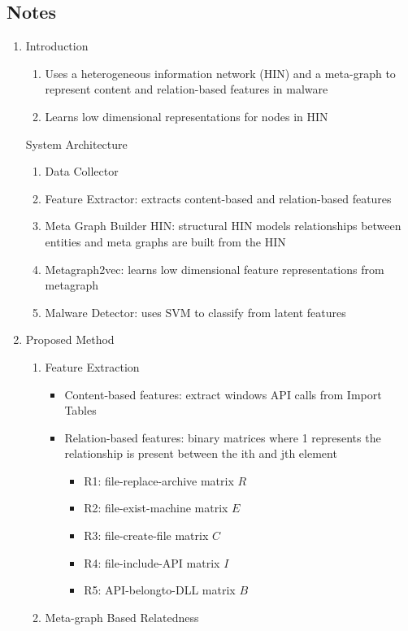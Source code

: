 \documentclass{article}
\begin{document}
\subsection*{Notes}

\begin{enumerate}
	\item Introduction
	\begin{enumerate}
	\item Uses a heterogeneous information network (HIN) and a meta-graph to represent content and relation-based features in malware
	\item Learns low dimensional representations for nodes in HIN
	\end{enumerate}
	System Architecture
	\begin{enumerate}
		\item Data Collector
		\item Feature Extractor: extracts content-based and relation-based features
		\item Meta Graph Builder HIN: structural HIN models relationships between entities and meta graphs are built from the HIN
		\item Metagraph2vec: learns low dimensional feature representations from metagraph
		\item Malware Detector: uses SVM to classify from latent features
	\end{enumerate}
	\item Proposed Method
	\begin{enumerate}
		\item Feature Extraction
		\begin{itemize}
			\item Content-based features: extract windows API calls from Import Tables
			\item Relation-based features: binary matrices where 1 represents the relationship is present between the ith and jth element
			\begin{itemize}
				\item R1: file-replace-archive matrix $R$
				\item R2: file-exist-machine matrix $E$
				\item R3: file-create-file matrix $C$
				\item R4: file-include-API matrix $I$
				\item R5: API-belongto-DLL matrix $B$
			\end{itemize}
		\end{itemize}
		\item Meta-graph Based Relatedness

\end{enumerate}
\end{enumerate}
\end{document}
